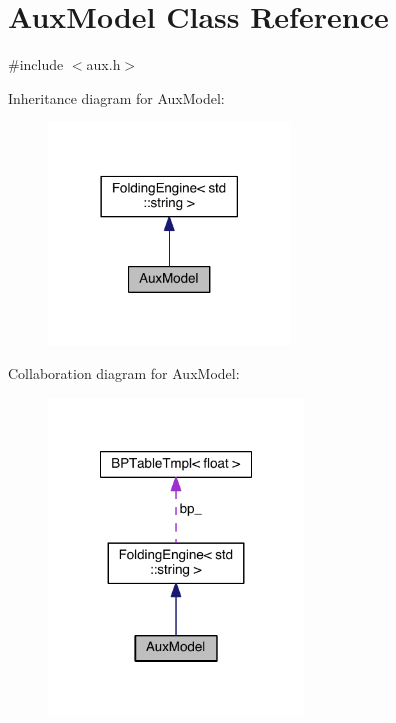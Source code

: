 \hypertarget{class_aux_model}{\section{Aux\+Model Class Reference}
\label{class_aux_model}
}


{\ttfamily \#include $<$aux.\+h$>$}



Inheritance diagram for Aux\+Model\+:
\nopagebreak
\begin{figure}[H]
\begin{center}
\leavevmode
\includegraphics[width=182pt]{class_aux_model__inherit__graph}
\end{center}
\end{figure}


Collaboration diagram for Aux\+Model\+:
\nopagebreak
\begin{figure}[H]
\begin{center}
\leavevmode
\includegraphics[width=192pt]{class_aux_model__coll__graph}
\end{center}
\end{figure}
